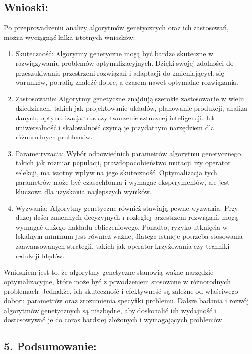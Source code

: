\documentclass[11pt]{article}
\begin{document}
\hypertarget{wnioski}{%
\subsection{Wnioski:}\label{wnioski}}

Po przeprowadzeniu analizy algorytmów genetycznych oraz ich zastosowań,
można wyciągnąć kilka istotnych wniosków:

\begin{enumerate}
\def\labelenumi{\arabic{enumi}.}
\item
  Skuteczność: Algorytmy genetyczne mogą być bardzo skuteczne w
  rozwiązywaniu problemów optymalizacyjnych. Dzięki swojej zdolności do
  przeszukiwania przestrzeni rozwiązań i adaptacji do zmieniających się
  warunków, potrafią znaleźć dobre, a czasem nawet optymalne
  rozwiązania.
\item
  Zastosowanie: Algorytmy genetyczne znajdują szerokie zastosowanie w
  wielu dziedzinach, takich jak projektowanie układów, planowanie
  produkcji, analiza danych, optymalizacja tras czy tworzenie sztucznej
  inteligencji. Ich uniwersalność i skalowalność czynią je przydatnym
  narzędziem dla różnorodnych problemów.
\item
  Parametryzacja: Wybór odpowiednich parametrów algorytmu genetycznego,
  takich jak rozmiar populacji, prawdopodobieństwo mutacji czy operator
  selekcji, ma istotny wpływ na jego skuteczność. Optymalizacja tych
  parametrów może być czasochłonna i wymagać eksperymentów, ale jest
  kluczowa dla uzyskania najlepszych wyników.
\item
  Wyzwania: Algorytmy genetyczne również stawiają pewne wyzwania. Przy
  dużej ilości zmiennych decyzyjnych i rozległej przestrzeni rozwiązań,
  mogą wymagać dużego nakładu obliczeniowego. Ponadto, ryzyko utknięcia
  w lokalnym minimum jest również ważne, dlatego istnieje potrzeba
  stosowania zaawansowanych strategii, takich jak operator krzyżowania
  czy techniki redukcji błędów.
\end{enumerate}

Wnioskiem jest to, że algorytmy genetyczne stanowią ważne narzędzie
optymalizacyjne, które może być z powodzeniem stosowane w różnorodnych
problemach. Jednakże, ich skuteczność i efektywność są zależne od
właściwego doboru parametrów oraz zrozumienia specyfiki problemu. Dalsze
badania i rozwój algorytmów genetycznych są niezbędne, aby doskonalić
ich wydajność i dostosowywać je do coraz bardziej złożonych i
wymagających problemów.

    \hypertarget{podsumowanie}{%
\subsection{5. Podsumowanie:}\label{podsumowanie}}
\end{document}
